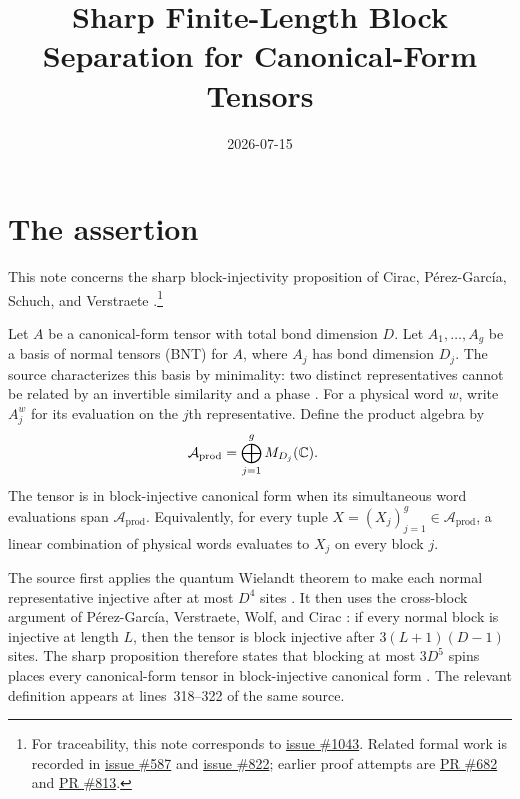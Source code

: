 \documentclass{article}
\title{Sharp Finite-Length Block Separation for Canonical-Form Tensors}
\author{}
\date{2026-07-15}
\begin{document}
\maketitle
{}

\section{The assertion}

This note concerns the sharp block-injectivity proposition of Cirac,
P\'erez-Garc\'ia, Schuch, and Verstraete
\cite[lines~340--345]{Cirac2016MPDO_arXiv}.\footnote{For traceability,
    this note corresponds to
    \href{https://github.com/LionSR/TNLean/issues/1043}{issue \#1043}.
    Related formal work is recorded in
    \href{https://github.com/LionSR/TNLean/issues/587}{issue \#587} and
    \href{https://github.com/LionSR/TNLean/issues/822}{issue \#822};
    earlier proof attempts are
    \href{https://github.com/LionSR/TNLean/pull/682}{PR \#682} and
    \href{https://github.com/LionSR/TNLean/pull/813}{PR \#813}.}

Let $A$ be a canonical-form tensor with total bond dimension $D$. Let
$A_1,\ldots,A_g$ be a basis of normal tensors (BNT) for $A$, where $A_j$ has
bond dimension $D_j$. The source characterizes this basis by minimality: two
distinct representatives cannot be related by an invertible similarity and a
phase \cite{Cirac2016MPDO_arXiv}. For a physical word $w$, write $A_j^w$ for
its evaluation on the $j$th representative. Define the product algebra by
\begin{align}
    \mathcal A_{\mathrm{prod}}
        &= \bigoplus_{j=1}^{g} M_{D_j}(\mathbb{C}).
    \label{eq:cpgsv17_bicf_block_separation_product_algebra}
\end{align}
The tensor is in block-injective canonical form when its simultaneous word
evaluations span $\mathcal A_{\mathrm{prod}}$. Equivalently, for every tuple
$X=(X_j)_{j=1}^g\in\mathcal A_{\mathrm{prod}}$, a linear combination of
physical words evaluates to $X_j$ on every block $j$.

The source first applies the quantum Wielandt theorem to make each normal
representative injective after at most $D^4$ sites
\cite{Sanz2010Quantum,Cirac2016MPDO_arXiv}. It then uses the cross-block
argument of P\'erez-Garc\'ia, Verstraete, Wolf, and Cirac
\cite{PerezGarcia2007MPSReps}: if every normal block is injective at length
$L$, then the tensor is block injective after $3(L+1)(D-1)$ sites. The sharp
proposition therefore states that blocking at most $3D^5$ spins places every
canonical-form tensor in block-injective canonical form
\cite[lines~340--345]{Cirac2016MPDO_arXiv}. The relevant definition appears at
lines~318--322 of the same source.
\end{document}
